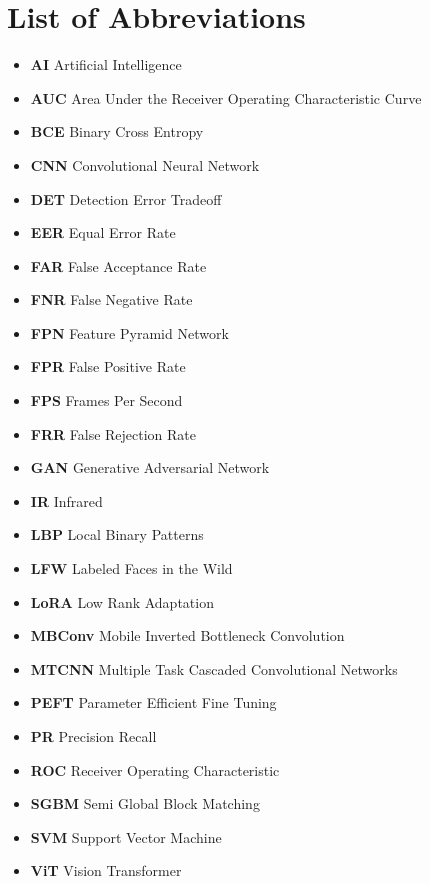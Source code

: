 \documentclass[12pt,a4paper]{report}
\begin{document}
\chapter*{List of Abbreviations}
\begin{itemize}
    \item \textbf{AI} Artificial Intelligence
    \item \textbf{AUC} Area Under the Receiver Operating Characteristic Curve
    \item \textbf{BCE} Binary Cross Entropy
    \item \textbf{CNN} Convolutional Neural Network
    \item \textbf{DET} Detection Error Tradeoff
    \item \textbf{EER} Equal Error Rate
    \item \textbf{FAR} False Acceptance Rate
    \item \textbf{FNR} False Negative Rate
    \item \textbf{FPN} Feature Pyramid Network
    \item \textbf{FPR} False Positive Rate
    \item \textbf{FPS} Frames Per Second
    \item \textbf{FRR} False Rejection Rate
    \item \textbf{GAN} Generative Adversarial Network
    \item \textbf{IR} Infrared
    \item \textbf{LBP} Local Binary Patterns
    \item \textbf{LFW} Labeled Faces in the Wild
    \item \textbf{LoRA} Low Rank Adaptation
    \item \textbf{MBConv} Mobile Inverted Bottleneck Convolution
    \item \textbf{MTCNN} Multiple Task Cascaded Convolutional Networks
    \item \textbf{PEFT} Parameter Efficient Fine Tuning
    \item \textbf{PR} Precision Recall
    \item \textbf{ROC} Receiver Operating Characteristic
    \item \textbf{SGBM} Semi Global Block Matching
    \item \textbf{SVM} Support Vector Machine
    \item \textbf{ViT} Vision Transformer
\end{itemize}
\end{document}
